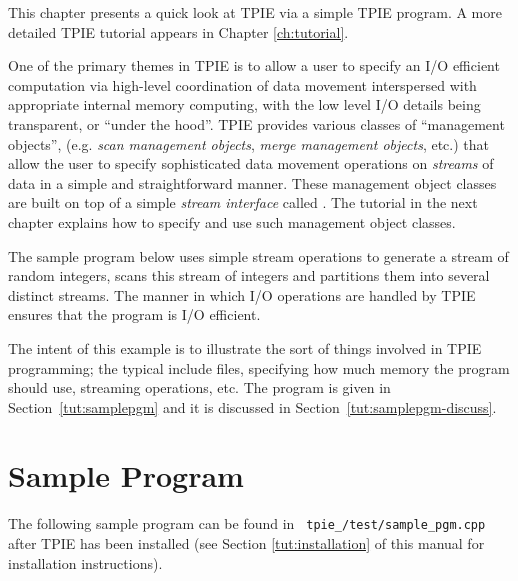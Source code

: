 This chapter presents a quick look
at TPIE via a simple TPIE program. A more detailed TPIE
tutorial appears in Chapter \ref{ch:tutorial}. 

One of the primary themes in TPIE is to allow a user to
specify an I/O efficient computation via 
high-level coordination of data movement interspersed with
appropriate internal memory computing, with the low level I/O
details being transparent, or ``under the hood''.
TPIE provides various classes of ``management objects'',
(e.g. \emph{scan management
   objects}, \emph{merge management objects}, etc.) that
allow the user to specify sophisticated data movement
operations on \emph{streams} of data in a simple and
straightforward manner. These management object classes are
built on top of a simple \emph{stream interface} called
. The tutorial in the next chapter explains
how to specify and use such management object classes.

The sample program below uses simple stream
operations %
to generate a stream of random integers, scans this stream
of integers and partitions them into several distinct
streams. The manner in which I/O operations are handled by
TPIE ensures that the program is I/O efficient.


The intent of this example is to illustrate the sort of
things involved in TPIE programming; the typical include
files, specifying how much memory the program should use,
streaming operations, etc. The program is given in
Section~\ref{tut:samplepgm} and it is discussed in
Section~\ref{tut:samplepgm-discuss}.


\section{Sample Program}

The following sample program can be found in {\tt
   tpie\_\version/test/sample\_pgm.cpp} after TPIE has been
   installed (see Section \ref{tut:installation} of this manual for installation instructions).

